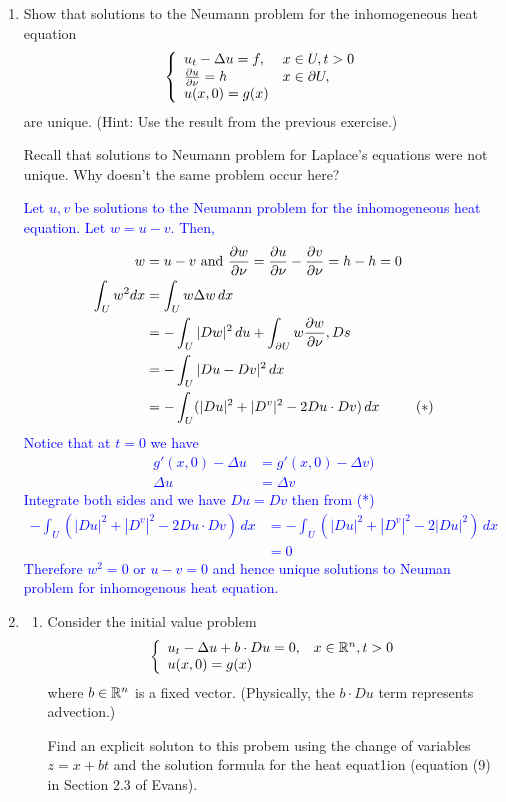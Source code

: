\documentclass[10pt,a4paper]{report}
\newcommand{\BLUE}[1]{\textcolor{blue}{#1}}
\begin{document}
\begin{enumerate}
\item Show that solutions to the Neumann problem for the inhomogeneous heat equation
\begin{align*}
	\left \{ \begin{array}{ll} u_t - \Delta u=f, & x\in U, t>0\\ \frac{\partial u}{\partial \nu} = h & x\in \partial U,\\u(x,0)=g(x) \end{array} \right .
\end{align*}are unique.  (Hint: Use the result from the previous exercise.)

Recall that solutions to Neumann problem for Laplace's equations were not unique.  Why doesn't the same problem occur here?

\BLUE{Let $u,v$ be solutions to the Neumann problem for the inhomogeneous heat equation.  Let $w = u-v$. Then,
\begin{align*}
	w &= u - v \text{ and } \frac{\partial w}{\partial \nu} = \frac{\partial u}{\partial \nu}-\frac{\partial v}{\partial \nu} = h - h = 0\\
	\int_U w^2 dx &= \int_U w\Delta w\, dx \\
	&= -\int_U |Dw|^2\, du + \int_{\partial U} w \frac{\partial w}{\partial \nu}, Ds\\
	&= -\int_U |Du-Dv|^2\, dx \\
	&= -\int_U (|Du|^2 + |D^v|^2-2Du\cdot Dv)\, dx & (*)\\
\end{align*}Notice that at $t=0$ we have
\begin{align*}
	g'(x,0)-\Delta u &= g'(x,0)-\Delta v) \\
	\Delta u &= \Delta v 
\end{align*}Integrate both sides and we have $Du = Dv$ then from (*)
\begin{align*}
	-\int_U (|Du|^2 + |D^v|^2-2Du\cdot Dv)\, dx &= -\int_U (|Du|^2 + |D^v|^2-2|Du|^2)\, dx \\
	&= 0 
\end{align*}Therefore $w^2 = 0$ or $u-v=0$ and hence unique solutions to Neuman problem for inhomogenous heat equation.
}

\item \begin{enumerate}[label=(\alph*)]

	\item Consider the initial value problem 
	\begin{align*}
		\left \{ \begin{array}{ll} u_t-\Delta u+b\cdot Du=0, & x\in \mathbb{R}^n, t>0\\ u(x,0)=g(x)  \end{array} \right .
	\end{align*}where $b \in \mathbb{R}^n$ is a fixed vector. (Physically, the $b\cdot  Du$ term represents advection.)
	
	Find an explicit soluton to this probem using the  change of variables $z=x+bt$ and the solution formula for the heat equat1ion (equation (9) in Section 2.3 of Evans).


\end{enumerate}
\end{enumerate}
\end{document}
